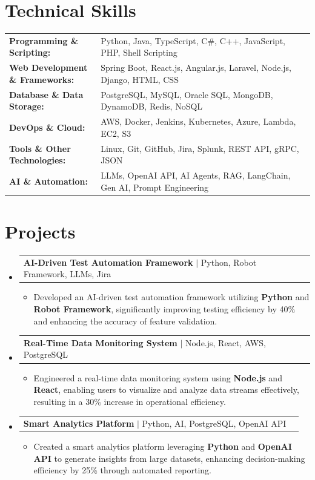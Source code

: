 \documentclass[letterpaper,10pt]{article}
\makeatletter
\newcommand{\resumeItem}[1]{
  \item{\fontsize{8pt}{9pt}\selectfont
    #1 \vspace{-3pt}
  }
}
\newcommand{\resumeProjectHeading}[2]{
    \item
    \begin{tabular*}{1.001\textwidth}{l@{\extracolsep{\fill}}r}
      \fontsize{8.5pt}{10pt}#1 & \textbf{\fontsize{8.5pt}{10pt} #2}\\
    \end{tabular*}\vspace{-7pt}
}
\newcommand{\resumeSubHeadingListStart}{\begin{itemize}[leftmargin=0pt, label={}]}
\newcommand{\resumeSubHeadingListEnd}{\end{itemize}}
\newcommand{\resumeItemListStart}{\begin{itemize}[leftmargin=*]}
\newcommand{\resumeItemListEnd}{\end{itemize}\vspace{-5pt}}
\makeatother
\begin{document}
\section{Technical Skills}
        \vspace{-14pt}
        \begin{table}[h]
            \fontsize{8pt}{9pt}\selectfont
            \begin{tabular}{p{0.3\linewidth} p{0.7\linewidth}}
                \textbf{Programming \& Scripting:} & Python, Java, TypeScript, C\#, C++, JavaScript, PHP, Shell Scripting \\
                \textbf{Web Development \& Frameworks:} & Spring Boot, React.js, Angular.js, Laravel, Node.js, Django, HTML, CSS \\
                \textbf{Database \& Data Storage:} & PostgreSQL, MySQL, Oracle SQL, MongoDB, DynamoDB, Redis, NoSQL \\
                \textbf{DevOps \& Cloud:} & AWS, Docker, Jenkins, Kubernetes, Azure, Lambda, EC2, S3 \\
                \textbf{Tools \& Other Technologies:} & Linux, Git, GitHub, Jira, Splunk, REST API, gRPC, JSON \\
                \textbf{AI \& Automation:} & LLMs, OpenAI API, AI Agents, RAG, LangChain, Gen AI, Prompt Engineering \\
            \end{tabular}
        \end{table}
 \vspace{-18pt}

\section{Projects}
    \vspace{-5pt}
    \resumeSubHeadingListStart
          \resumeProjectHeading
            {\textbf{AI-Driven Test Automation Framework} $|$ Python, Robot Framework, LLMs, Jira}{}
            \resumeItemListStart
                \resumeItem{Developed an AI-driven test automation framework utilizing \textbf{Python} and \textbf{Robot Framework}, significantly improving testing efficiency by 40\% and enhancing the accuracy of feature validation.}
            \resumeItemListEnd
        \vspace{-12pt}
    
        \resumeProjectHeading
            {\textbf{Real-Time Data Monitoring System} $|$ Node.js, React, AWS, PostgreSQL}{}
        \resumeItemListStart
                \resumeItem{Engineered a real-time data monitoring system using \textbf{Node.js} and \textbf{React}, enabling users to visualize and analyze data streams effectively, resulting in a 30\% increase in operational efficiency.}
        \resumeItemListEnd
      \vspace{-12pt}
      \resumeProjectHeading
        {\textbf{Smart Analytics Platform} $|$ Python, AI, PostgreSQL, OpenAI API}{}
    \resumeItemListStart
            \resumeItem{Created a smart analytics platform leveraging \textbf{Python} and \textbf{OpenAI API} to generate insights from large datasets, enhancing decision-making efficiency by 25\% through automated reporting.}
    \resumeItemListEnd
    \resumeSubHeadingListEnd
\end{document}
